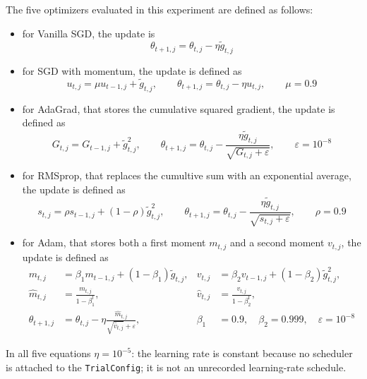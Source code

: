 The five optimizers evaluated in this experiment are defined as follows:
\begin{itemize}
    \item[-] for Vanilla SGD, the update is $$\theta_{t+1,j}=\theta_{t,j}-\eta\tilde{g}_{t,j}$$
    \item[-] for SGD with momentum, the update is defined as 
    \begin{equation*}
    u_{t,j}=\mu u_{t-1,j}+\widetilde{g}_{t,j},
    \qquad
    \theta_{t+1,j}=\theta_{t,j}-\eta u_{t,j},
    \qquad \mu=0.9
    \end{equation*}
    \item[-] for AdaGrad, that stores the cumulative squared gradient, the update is defined as 
    \begin{equation*}
    G_{t,j}=G_{t-1,j}+\widetilde{g}_{t,j}^{2},
    \qquad
    \theta_{t+1,j}=\theta_{t,j}-
    \frac{\eta\widetilde{g}_{t,j}}{\sqrt{G_{t,j}+\varepsilon}},
    \qquad \varepsilon=10^{-8}
    \end{equation*}
    \item[-] for RMSprop, that replaces the cumultive sum with an exponential average, the update is defined as 
    \begin{equation*}
    s_{t,j}=\rho s_{t-1,j}+(1-\rho)\widetilde{g}_{t,j}^{2},
    \qquad
    \theta_{t+1,j}=\theta_{t,j}-
    \frac{\eta\widetilde{g}_{t,j}}{\sqrt{s_{t,j}+\varepsilon}},
    \qquad \rho=0.9
    \end{equation*}
    \item[-] for Adam, that stores both a first moment $m_{t,j}$ and a second moment $v_{t,j}$, the update is defined as 
    \begin{equation*}
    \begin{aligned}
    m_{t,j}&=\beta_1m_{t-1,j}+(1-\beta_1)\widetilde{g}_{t,j},
    &v_{t,j}&=\beta_2v_{t-1,j}+(1-\beta_2)\widetilde{g}_{t,j}^{2},\\
    \widehat{m}_{t,j}&=\frac{m_{t,j}}{1-\beta_1^t},
    &\widehat{v}_{t,j}&=\frac{v_{t,j}}{1-\beta_2^t},\\
    \theta_{t+1,j}&=\theta_{t,j}-\eta
    \frac{\widehat{m}_{t,j}}{\sqrt{\widehat{v}_{t,j}}+\varepsilon},
    &\beta_1&=0.9,\quad \beta_2=0.999,\quad \varepsilon=10^{-8}
    \end{aligned}
    \end{equation*}
\end{itemize}
In all five equations $\eta=10^{-5}$: the learning rate is constant because no scheduler is attached to the \texttt{TrialConfig}; it is not an unrecorded learning-rate schedule.\\

